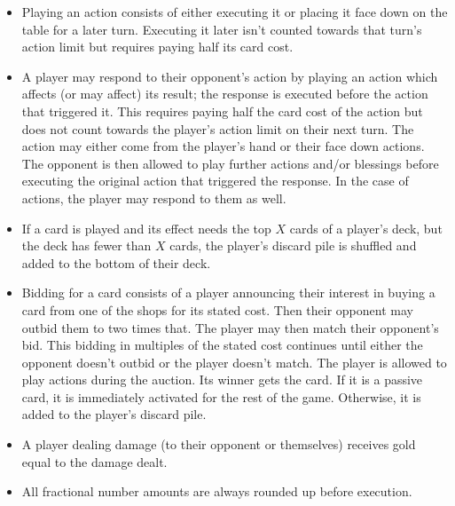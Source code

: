 \documentclass[dvipsnames,parskip,a4paper]{scrartcl}
\begin{document}
\begin{itemize}
\item

Playing an action consists of either executing it or placing it face down on the table for a later turn. Executing it later isn't counted towards that turn's action limit but requires paying half its card cost.

\item

A player may respond to their opponent's action by playing an action which affects (or may affect) its result; the response is executed before the action that triggered it. This requires paying half the card cost of the action but does not count towards the player's action limit on their next turn. The action may either come from the player's hand or their face down actions. The opponent is then allowed to play further actions and/or blessings before executing the original action that triggered the response. In the case of actions, the player may respond to them as well.

\item

If a card is played and its effect needs the top $X$ cards of a player's deck, but the deck has fewer than $X$ cards, the player's discard pile is shuffled and added to the bottom of their deck.

\item

Bidding for a card consists of a player announcing their interest in buying a card from one of the shops for its stated cost. Then their opponent may outbid them to two times that. The player may then match their opponent's bid. This bidding in multiples of the stated cost continues until either the opponent doesn't outbid or the player doesn't match. The player is allowed to play actions during the auction. Its winner gets the card. If it is a passive card, it is immediately activated for the rest of the game. Otherwise, it is added to the player's discard pile.

\item

A player dealing damage (to their opponent or themselves) receives gold equal to the damage dealt.

\item

All fractional number amounts are always rounded up before execution.

\end{itemize}

\newpage
\end{document}
